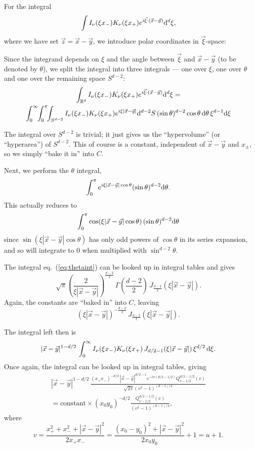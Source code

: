 For the integral
$$\int I_\nu(\xi x_{-}) K_\nu(\xi x_{+}) e^{i\vec{\xi}\cdot(\vec x-\vec y)} \mathrm{d}^d\xi,$$
where we have set $\vec z=\vec x-\vec y$, we introduce polar coordinates in $\vec\xi$-space:

Since the integrand depends on $\xi$ and the angle between $\vec\xi$ and $\vec x-\vec y$ (to be denoted by $\theta$), we split the integral into three integrals --- one over $\xi$, one over $\theta$ and one over the remaining space $S^{d-2}$:
\begin{multline} %
\int_{\mathbb{R}^d} I_\nu(\xi x_{-}) K_\nu(\xi x_{+}) e^{i\vec{\xi}\cdot(\vec x-\vec y)} \ud^d\xi= \\
\int_0^\infty\!\! \int_0^\pi\!\! \int_{S^{d-2}} I_\nu(\xi x_{-}) K_\nu(\xi x_{+}) e^{i\xi|\vec x-\vec y|} \ud^{d-2}S\,  (\sin\theta)^{d-2}\cos\theta\,\ud\theta\, \xi^{d-1}\ud\xi
\end{multline} %

The integral over $S^{d-2}$ is trivial; it just gives us the ``hypervolume'' (or ``hyperarea'') of $S^{d-2}$. This of course is a constant, independent of $\vec x-\vec y$ and $x_\pm$, so we simply ``bake it in'' into $C$.

Next, we perform the $\theta$ integral,
$$\int_0^\pi e^{i \xi |\vec x-\vec y| \cos\theta} (\sin\theta)^{d-2}\mathrm{d}\theta.$$
This actually reduces to
\begin{equation}\label{eq:thetaint}
\int_0^\pi \cos(\xi |\vec x-\vec y| \cos\theta)\, (\sin\theta)^{d-2}\mathrm{d}\theta
\end{equation}
since $\sin(\xi |\vec x-\vec y| \cos\theta)$ has only odd powers of $\cos\theta$ in its series expansion, and so will integrate to $0$ when multiplied with $\sin^{d-2}\theta$.

The integral eq.~(\ref{eq:thetaint}) can be looked up in integral tables and gives
$$\sqrt\pi \left(\frac{2}{\xi|\vec x-\vec y|}\right)^{\frac{d-2}{2}}\, \Gamma\left(\frac{d-2}{2}\right)\, J_{\frac{d-2}{2}}(\xi|\vec x-\vec y|).$$
Again, the constants are ``baked in'' into $C$, leaving
$$(\xi |\vec x-\vec y|)^{-\frac{d-2}{2}}\, J_{\frac{d-2}{2}}(\xi |\vec x-\vec y|).$$

The integral left then is
$$|\vec x-\vec y|^{1-d/2}\, \int_0^\infty I_\nu(\xi x_{-}) K_\nu(\xi x_{+})\, J_{d/2-1}(\xi |\vec x-\vec y|)\,  \xi^{d/2}\, \mathrm{d}\xi.$$
Once again, the integral can be looked up in integral tables, giving
\begin{multline}
|\vec x-\vec y|^{1-d/2}\, \frac{(x_{+}x_{-})^{-d/2}\, |\vec x-\vec y|^{d/2-1} e^{-i\pi(d/2-1/2)} Q_{\nu-1/2}^{d/2-1/2}(v)}{\sqrt{2\pi}(v^2-1)^{(d-1)/4}} \\
= \text{constant} \times (x_0 y_0)^{-d/2} \frac{Q_{\nu-1/2}^{d/2-1/2}(v)}{(v^2-1)^{(d-1)/4}},
\end{multline}
where
$$v = \frac{x_{+}^2+x_{-}^2+|\vec x-\vec y|^2}{2x_{+}x_{-}} =
\frac{(x_0-y_0)^2+|\vec x-\vec y|^2}{2 x_0 y_0}+1 = u+1.$$

